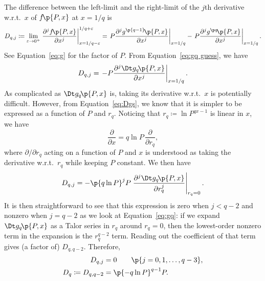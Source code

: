 \documentclass[oneside,12pt,final]{ucthesis-CA2012}
\newcommand{\veps}{\varepsilon}
\newcommand{\ceq}{\coloneqq}
\newcommand{\fr}{\frac}
\newcommand{\fc}[2]{#1\mathchoice{\!}{\!}{}{}\p{#2}} %
\newcommand{\abar}[2]{\left.#1\right|_{#2}} %
\begin{document}
\begin{mainmatter}
The difference between the left-limit and the right-limit of the $j$th derivative
w.r.t.\ $x$ of $\fc f{P,x}$ at $x=1/q$ is
\[D_{q,j}
\ceq\lim_{\veps\to0^+}\abar{\fr{\partial^j\fc f{P,x}}{\partial x^j}}{x=1/q-\veps}^{1/q+\veps}
=\abar{P\fr{\partial^j\fc{g^{\p{q-1}}}{P,x}}{\partial x^j}}{x=1/q}
-\abar{P\fr{\partial^j\fc{g^{\p q}}{P,x}}{\partial x^j}}{x=1/q}.\]
See Equation~\ref{eq:g} for the factor of $P$.
From Equation~\ref{eq:gq guess}, we have
\[D_{q,j}=\abar{-P\fr{\partial^j\fc{\Dt g_q}{P,x}}{\partial x^j}}{x=1/q}.\]
As complicated as $\fc{\Dt g_q}{P,x}$ is,
taking its derivative w.r.t.\ $x$ is potentially difficult.
However, from Equation~\ref{eq:Dgs}, we know that it is simpler to be expressed as a function
of $P$ and $r_q$.
Noticing that $r_q\ceq\ln P^{qx-1}$ is linear in $x$, we have
\begin{equation}
	\label{eq:partial rq}
	\fr\partial{\partial x}=q\ln P\,\fr\partial{\partial r_q},
\end{equation}
where $\partial/\partial r_q$ acting on a function of $P$ and $x$
is understood as taking the derivative w.r.t.\ $r_q$ while keeping $P$ constant.
We then have
\[D_{q,j}=-\p{q\ln P}^jP\abar{\fr{\partial^j\fc{\Dt g_q}{P,x}}{\partial r_q^j}}{r_q=0}.\]
It is then straightforward to see that this expression
is zero when $j<q-2$ and nonzero when $j=q-2$
as we look at Equation~\ref{eq:gq}:
if we expand $\fc{\Dt g_q}{P,x}$ as a Talor series in $r_q$ around $r_q=0$,
then the lowest-order nonzero term in the expansion is the $r_q^{q-2}$ term.
Reading out the coefficient of that term gives (a factor of) $D_{q,q-2}$.
Therefore,
\begin{align*}
	D_{q,j}&=0\qquad\p{j=0,1,\ldots,q-3},\\
	D_q\ceq D_{q,q-2}&=\p{-q\ln P}^{q-1}P.
\end{align*}


\end{mainmatter}
\end{document}

